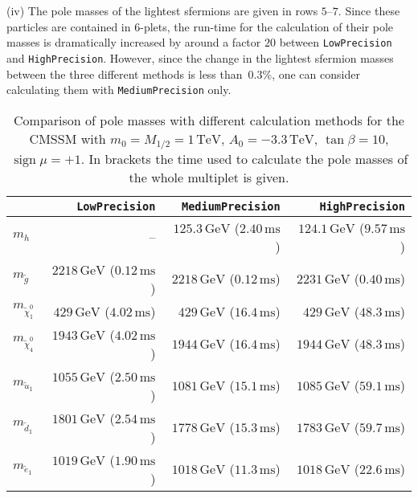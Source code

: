 \documentclass[final,3p,11pt,pdflatex]{elsarticle}
\newcommand{\code}[1]{\lstinline|#1|}  %
\newcommand{\unit}[1]{\,\text{#1}}      %
\DeclareMathOperator{\sign}{sign}
\begin{document}
%
(iv) The pole masses of the lightest sfermions are given in rows
$5$--$7$.  Since these particles are contained in $6$-plets, the
run-time for the calculation of their pole masses is dramatically
increased by around a factor $20$ between \code{LowPrecision} and
\code{HighPrecision}.  However, since the change in the lightest
sfermion masses between the three different methods is less than
$\unit{0.3\%}$, one can consider calculating them with
\code{MediumPrecision} only.
%
\begin{table}[tbh]
  \centering
  \begin{tabular}{lrrr}
    \toprule
    & \code{LowPrecision}
    & \code{MediumPrecision}
    & \code{HighPrecision}\\
    \midrule
    $m_h$
    & --
    & $125.3\unit{GeV}$ ($2.40\unit{ms}$)
    & $124.1\unit{GeV}$ ($9.57\unit{ms}$) \\
    $m_{\tilde{g}}$
    & $2218\unit{GeV}$ ($0.12\unit{ms}$)
    & $2218\unit{GeV}$ ($0.12\unit{ms}$)
    & $2231\unit{GeV}$ ($0.40\unit{ms}$) \\
    $m_{\tilde{\chi}_1^0}$
    & $429\unit{GeV}$ ($4.02\unit{ms}$)
    & $429\unit{GeV}$ ($16.4\unit{ms}$)
    & $429\unit{GeV}$ ($48.3\unit{ms}$) \\
    $m_{\tilde{\chi}_4^0}$
    & $1943\unit{GeV}$ ($4.02\unit{ms}$)
    & $1944\unit{GeV}$ ($16.4\unit{ms}$)
    & $1944\unit{GeV}$ ($48.3\unit{ms}$) \\
    $m_{\tilde{u}_1}$
    & $1055\unit{GeV}$ ($2.50\unit{ms}$)
    & $1081\unit{GeV}$ ($15.1\unit{ms}$)
    & $1085\unit{GeV}$ ($59.1\unit{ms}$) \\
    $m_{\tilde{d}_1}$
    & $1801\unit{GeV}$ ($2.54\unit{ms}$)
    & $1778\unit{GeV}$ ($15.3\unit{ms}$)
    & $1783\unit{GeV}$ ($59.7\unit{ms}$) \\
    $m_{\tilde{e}_1}$
    & $1019\unit{GeV}$ ($1.90\unit{ms}$)
    & $1018\unit{GeV}$ ($11.3\unit{ms}$)
    & $1018\unit{GeV}$ ($22.6\unit{ms}$) \\
    \bottomrule
  \end{tabular}
  \caption{Comparison of pole masses with different calculation
    methods for the CMSSM with $m_0=M_{1/2}=1\unit{TeV}$, $A_0=-3.3\unit{TeV}$,
    $\tan\beta=10$, $\sign\mu=+1$.  In brackets the time used to calculate
    the pole masses of the whole multiplet is given.}
  \label{tab:pole-mass-precision-comparison}
\end{table}
%
\end{document}

